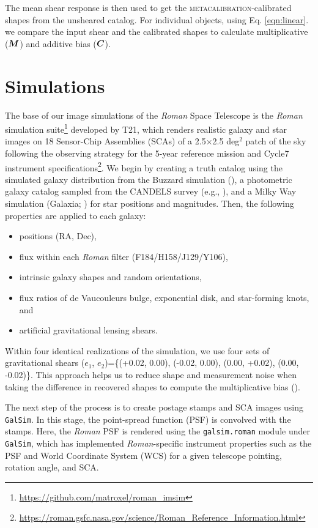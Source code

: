 \documentclass[fleqn,usenatbib]{mnras}
\begin{document}
The mean shear response is then used to get the \textsc{metacalibration}-calibrated shapes from the unsheared catalog. For individual objects, using Eq. \ref{eqn:linear}. we compare the input shear and the calibrated shapes to calculate multiplicative ($\vb*{M}$) and additive bias ($\vb*{C}$).


\section{Simulations}
\label{sec:sims}
The base of our image simulations of the \emph{Roman} Space Telescope is the \emph{Roman} simulation suite\footnote{\url{ https://github.com/matroxel/roman_imsim}} developed by T21, which renders realistic galaxy and star images on 18 Sensor-Chip Assemblies (SCAs) of a 2.5$\times$2.5 deg$^{2}$ patch of the sky following the observing strategy for the 5-year reference mission and Cycle7 instrument specifications\footnote{\url{https://roman.gsfc.nasa.gov/science/Roman_Reference_Information.html}}. We begin by creating a truth catalog using the simulated galaxy distribution from the Buzzard simulation (\citealt{2019arXiv190102401D}), a photometric galaxy catalog sampled from the CANDELS survey (e.g., \citealt{2019ApJ...877..117H}), and a Milky Way simulation (Galaxia; \citealt{2011ApJ...730....3S}) for star positions and magnitudes. Then, the following properties are applied to each galaxy:
\begin{itemize}
    \item positions (RA, Dec),
    \item flux within each \emph{Roman} filter (F184/H158/J129/Y106),
    \item intrinsic galaxy shapes and random orientations,
    \item flux ratios of de Vaucouleurs bulge, exponential disk, and star-forming knots, and
    \item artificial gravitational lensing shears.
\end{itemize} 
Within four identical realizations of the simulation, we use four sets of gravitational shears ($e_{1}$, $e_{2}$)=\{(+0.02, 0.00), (-0.02, 0.00), (0.00, +0.02), (0.00, -0.02)\}. This approach helps us to reduce shape and measurement noise when taking the difference in recovered shapes to compute the multiplicative bias (\citealt{2019A&A...621A...2P}). 


The next step of the process is to create postage stamps and SCA images using \texttt{GalSim}. In this stage, the point-spread function (PSF) is convolved with the stamps. Here, the \emph{Roman} PSF is rendered using the \texttt{galsim.roman} module under \texttt{GalSim}, which has implemented \emph{Roman}-specific instrument properties such as the PSF and World Coordinate System (WCS) for a given telescope pointing, rotation angle, and SCA.
\end{document}
